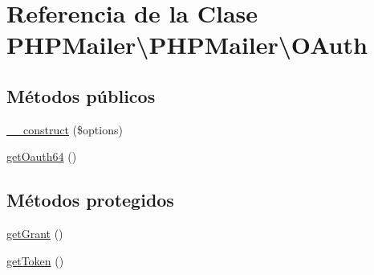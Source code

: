 \hypertarget{classPHPMailer_1_1PHPMailer_1_1OAuth}{}\section{Referencia de la Clase P\+H\+P\+Mailer\textbackslash{}P\+H\+P\+Mailer\textbackslash{}O\+Auth}
\label{classPHPMailer_1_1PHPMailer_1_1OAuth}
\subsection*{Métodos públicos}
\begin{DoxyCompactItemize}
\item 
\hyperlink{classPHPMailer_1_1PHPMailer_1_1OAuth_a58d10691ef6d5f8576b302ac11d39756}{\+\_\+\+\_\+construct} (\$options)
\item 
\hyperlink{classPHPMailer_1_1PHPMailer_1_1OAuth_a4a3f424167a7c1c4eb99068432045d5e}{get\+Oauth64} ()
\end{DoxyCompactItemize}
\subsection*{Métodos protegidos}
\begin{DoxyCompactItemize}
\item 
\hyperlink{classPHPMailer_1_1PHPMailer_1_1OAuth_a489d6e6f54e346e72b628be10863fd24}{get\+Grant} ()
\item 
\hyperlink{classPHPMailer_1_1PHPMailer_1_1OAuth_aca2254505ade7984c55d2fcdc1b2f44a}{get\+Token} ()
\end{DoxyCompactItemize}
